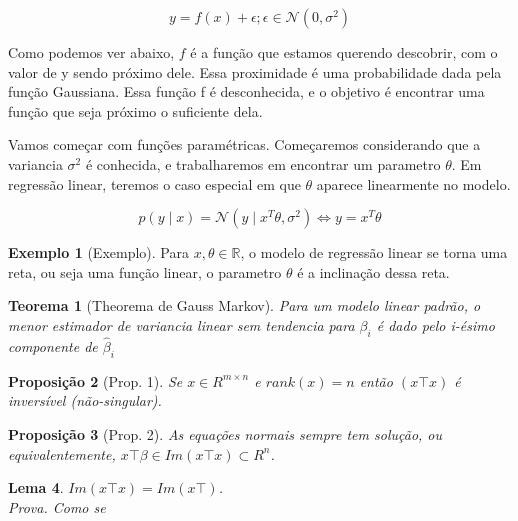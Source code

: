 \documentclass[a4paper, 12pt]{scrartcl}
\theoremstyle{plain}%
\newtheorem{teo}{Teorema}
\newtheorem{lema}[teo]{Lema}
\newtheorem{prop}[teo]{Proposição}
\theoremstyle{definition}
\newtheorem{exmp}{Exemplo}
\theoremstyle{remark}
\def \Real {\mathds{R}}
\begin{document}
\[
    y = f(x)+\epsilon ; \epsilon \in  \mathcal{N}(0,\sigma^2)
\]

Como podemos ver abaixo, $f$ é a função que estamos querendo descobrir, com o valor de y sendo próximo dele. Essa proximidade é uma probabilidade dada pela função Gaussiana.
Essa função f é desconhecida, e o objetivo é encontrar uma função que seja próximo o suficiente dela.

Vamos começar com funções paramétricas. Começaremos considerando que a variancia $\sigma^2$ é conhecida, e trabalharemos em encontrar um parametro $\theta$. 
Em regressão linear, teremos o caso especial em que $\theta$ aparece linearmente no modelo.

\[
    p(y\mid x) = \mathcal{N}(y\mid x^T\theta, \sigma^2) \Leftrightarrow y = x^T\theta
\]

\begin{exmp}[Exemplo]\label{exmp: B} 
Para $ x,\theta \in \Real $, o modelo de regressão linear se torna uma reta, ou seja uma função linear,
o parametro $\theta $ é a inclinação dessa reta.
\end{exmp}




\begin{teo}[Theorema de Gauss Markov]\label{teo: A} 
   Para um modelo linear padrão, o menor estimador de variancia linear sem tendencia para $\beta_i$
   é dado pelo i-ésimo componente de $\hat{\beta}_i$
\end{teo}

\begin{prop}[Prop. 1]
    Se $x \in R^{m \times n}$ e $rank(x) = n$ então $(x\top x)$ é inversível (não-singular).
\end{prop}

\begin{prop}[Prop. 2]
    As equações normais sempre tem solução, ou equivalentemente, $x\top \beta \in Im(x\top x) \subset R^n$.
\end{prop}

\begin{lema}
    $Im(x \top x) = Im(x \top)$.
    \\
    Prova. Como se
\end{lema}

\end{document}
